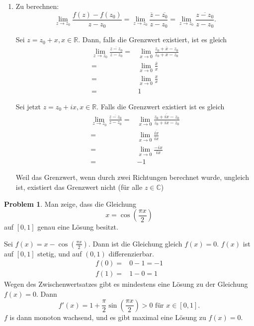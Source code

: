 \documentclass[prb,12pt]{revtex4-2}
\theoremstyle{definition}
\newtheorem{Problem}{Problem}
\theoremstyle{definition}
\newenvironment{parts}{\begin{enumerate}[label=(\alph*)]}{\end{enumerate}}
\newcommand{\R}{\mathbb{R}}
\newcommand{\Q}{\mathbb{Q}}
\newcommand{\C}{\mathbb{C}}
\begin{document}
\begin{parts}
\begin{enumerate}[label=(\roman*)]
		\item oder $x \not\in \Q$, also
			\[
			g(x)-g(0)=0-0=0\implies \frac{g(x)-g(0)}{x-0}=0
			.\] 
	\end{enumerate}
	Deshalb ist
	\[
	g'(0)=\lim_{x \to 0} \frac{g(x)-g(0)}{x-0}=0
	.\]
\item Zu berechnen:
	\[
		\lim_{z \to z_0} \frac{f(z)-f(z_0)}{z-z_0}=\lim_{z \to z_0} \frac{\overline{z}-\overline{z_0}}{z-z_0}=\lim_{z \to z_0} \frac{\overline{z-z_0}}{z-z_0}
	.\] 

	Sei $z=z_0+x, x\in \R$. Dann, falls die Grenzwert existiert, ist es gleich
	\begin{align*}
		\lim_{z \to z_0} \frac{\overline{z-z_0}}{z-z_0}=& \lim_{x \to 0} \frac{\overline{z_0+x-z_0}}{z_0+x-z_0}\\
		=& \lim_{x \to 0} \frac{\overline{x}}{x}\\
		=&\lim_{x \to 0} \frac{x}{x}\\
		=& 1
	\end{align*}

	Sei jetzt $z=z_0+ix, x\in \R$. Falls die Grenzwert existiert ist es gleich
	\begin{align*}
		\lim_{z \to z_0} \frac{\overline{z-z_0}}{z-z_0}=&\lim_{x \to 0} \frac{\overline{z_0+ix-z_0}}{z_0+ix-z_0}\\
		=& \lim_{x \to 0} \frac{\overline{ix}}{ix}\\
		=& \lim_{x \to 0} \frac{-ix}{ix} \\
		=& -1
	\end{align*}

	Weil das Grenzwert, wenn durch zwei Richtungen berechnet wurde, ungleich ist, existiert das Grenzwert nicht (f\"{u}r alle $z\in \C$)
\end{parts}

\begin{Problem}
	Man zeige, dass die Gleichung
	\[
	x=\cos\left( \frac{\pi x}{2} \right) \] 
	auf $[0,1]$ genau eine L\"{o}sung besitzt.
\end{Problem}

Sei $f(x)=x-\cos\left( \frac{\pi x}{2} \right) $. Dann ist die Gleichung gleich $f(x)=0$. $f(x)$ ist auf $[0,1]$ stetig, und auf $(0,1)$ differenzierbar.
\begin{align*}
	f(0)=& 0-1=-1\\
	f(1)=& 1-0=1
\end{align*}
Wegen des Zwischenwertsatzes gibt es mindestens eine L\"{o}sung zu der Gleichung $f(x)=0$. Dann
\[
	f'(x)=1+\frac{\pi}{2}\sin\left( \frac{\pi x}{2} \right) >0\text{ f\"{u}r }x\in [0,1]
.\] 
$f$ is dann monoton wachsend, und es gibt maximal eine L\"{o}sung zu $f(x)=0$.
\end{document}
